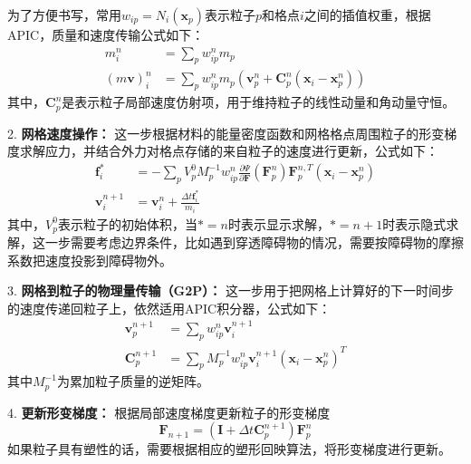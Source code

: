 为了方便书写，常用$w_{ip} = N_i(\mathbf{x}_p)$表示粒子$p$和格点$i$之间的插值权重，根据APIC，质量和速度传输公式如下：
\begin{equation}
    \begin{aligned}
        m_i^n &= \sum_p w_{ip}^n m_p \\
        (m\mathbf{v})_i^n &= \sum_p w_{ip}^n m_p (\mathbf{v}_p^n + \mathbf{C}_p^n (\mathbf{x}_i - \mathbf{x}_p^n))
    \end{aligned}
\end{equation}
其中，\(\mathbf{C}_p^n\)是表示粒子局部速度仿射项，用于维持粒子的线性动量和角动量守恒。

2. \textbf{网格速度操作：}
这一步根据材料的能量密度函数和网格格点周围粒子的形变梯度求解应力，并结合外力对格点存储的来自粒子的速度进行更新，公式如下：
\begin{equation}
    \begin{aligned}
        \mathbf{f}_i^* &= - \sum_p V_p^0 M_p^{-1} w_{ip}^n \frac{\partial \Psi}{\partial \mathbf{F}} (\mathbf{F}_p^n) \mathbf{F}_p^{n,T} (\mathbf{x}_i - \mathbf{x}_p^n) \\
        \mathbf{v}_i^{n + 1} &= \mathbf{v}_i^n + \frac{\Delta t \mathbf{f}_i^*}{m_i}
    \end{aligned}
\end{equation}
其中，\(V_p^0\)表示粒子的初始体积，当\(* = n\)时表示显示求解，\(* =n + 1\)时表示隐式求解，这一步需要考虑边界条件，比如遇到穿透障碍物的情况，需要按障碍物的摩擦系数把速度投影到障碍物外。

3. \textbf{网格到粒子的物理量传输（G2P）：}
这一步用于把网格上计算好的下一时间步的速度传递回粒子上，依然适用APIC积分器，公式如下：
\begin{equation}
    \begin{aligned}
        \mathbf{v}_p^{n + 1} &= \sum_p w_{ip}^n \mathbf{v}_i^{n + 1} \\
        \mathbf{C}_p^{n + 1} &= \sum_p M_p^{-1} w_{ip}^n \mathbf{v}_i^{n + 1} (\mathbf{x}_i - \mathbf{x}_p^n)^T
    \end{aligned}
\end{equation}
其中$ M_p^{-1}$为累加粒子质量的逆矩阵。

4. \textbf{更新形变梯度：}
根据局部速度梯度更新粒子的形变梯度
\begin{equation}
    \mathbf{F}_{n+1} = (\mathbf{I} + \Delta t \mathbf{C}_p^{n + 1}) \mathbf{F}_p^n
\end{equation}
如果粒子具有塑性的话，需要根据相应的塑形回映算法，将形变梯度进行更新。

